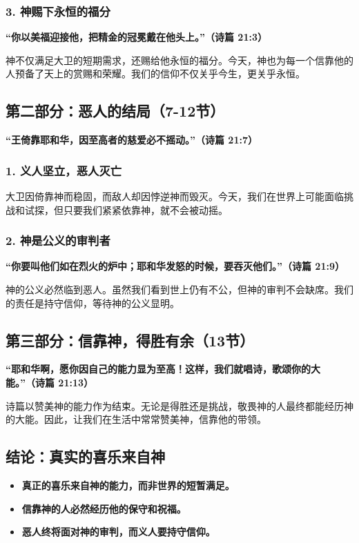 \documentclass[a4paper, 12pt]{article}
\begin{document}
\subsubsection*{3. 神赐下永恒的福分}

\textbf{“你以美福迎接他，把精金的冠冕戴在他头上。”（诗篇 21:3）}

神不仅满足大卫的短期需求，还赐给他永恒的福分。今天，神也为每一个信靠他的人预备了天上的赏赐和荣耀。我们的信仰不仅关乎今生，更关乎永恒。

\subsection*{第二部分：恶人的结局（7-12节）}

\textbf{“王倚靠耶和华，因至高者的慈爱必不摇动。”（诗篇 21:7）}

\subsubsection*{1. 义人坚立，恶人灭亡}

大卫因倚靠神而稳固，而敌人却因悖逆神而毁灭。今天，我们在世界上可能面临挑战和试探，但只要我们紧紧依靠神，就不会被动摇。

\subsubsection*{2. 神是公义的审判者}

\textbf{“你要叫他们如在烈火的炉中；耶和华发怒的时候，要吞灭他们。”（诗篇 21:9）}

神的公义必然临到恶人。虽然我们看到世上仍有不公，但神的审判不会缺席。我们的责任是持守信仰，等待神的公义显明。

\subsection*{第三部分：信靠神，得胜有余（13节）}

\textbf{“耶和华啊，愿你因自己的能力显为至高！这样，我们就唱诗，歌颂你的大能。”（诗篇 21:13）}

诗篇以赞美神的能力作为结束。无论是得胜还是挑战，敬畏神的人最终都能经历神的大能。因此，让我们在生活中常常赞美神，信靠他的带领。

\subsection*{结论：真实的喜乐来自神}

\begin{itemize}
    \item \textbf{真正的喜乐来自神的能力，而非世界的短暂满足。}
    \item \textbf{信靠神的人必然经历他的保守和祝福。}
    \item \textbf{恶人终将面对神的审判，而义人要持守信仰。}
\end{itemize}
\end{document}
